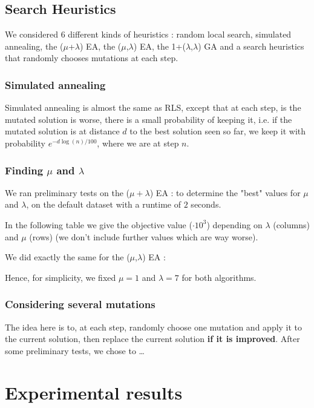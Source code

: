 \documentclass[a4paper]{article}
\begin{document}
\subsection{Search Heuristics}
We considered 6 different kinds of heuristics : random local search, simulated annealing, the ($\mu$+$\lambda$) EA, the ($\mu$,$\lambda$) EA, the 1+($\lambda$,$\lambda$) GA and a search heuristics that randomly chooses mutations at each step.
\subsubsection{Simulated annealing}
Simulated annealing is almost the same as RLS, except that at each step, is the mutated solution is worse, there is a small probability of keeping it, i.e. if the mutated solution is at distance $d$ to the best solution seen so far, we keep it with probability $e^{-d\log(n)/100}$, where we are at step $n$.

\subsubsection{Finding $\mu$ and $\lambda$}
We ran preliminary tests on the ($\mu + \lambda$) EA : to determine the "best" values for $\mu$ and $\lambda$, on the default dataset with a runtime of $2$ seconds.

In the following table we give the objective value ($\cdot 10^3$) depending on $\lambda$ (columns) and $\mu$ (rows) (we don't include further values which are way worse). 

\begin{center}
\end{center}

We did exactly the same for the ($\mu$,$\lambda$) EA :


\begin{center}
\end{center}

Hence, for simplicity, we fixed $\mu=1$ and $\lambda=7$ for both algorithms.

\subsubsection{Considering several mutations}
The idea here is to, at each step, randomly choose one mutation and apply it to the current solution, then replace the current solution \textbf{if it is improved}. After some preliminary tests, we chose to …
\section{Experimental results}
\end{document}
